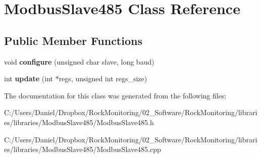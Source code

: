 \hypertarget{class_modbus_slave485}{}\section{Modbus\+Slave485 Class Reference}
\label{class_modbus_slave485}
\subsection*{Public Member Functions}
\begin{DoxyCompactItemize}
\item 
void {\bfseries configure} (unsigned char slave, long baud)\hypertarget{class_modbus_slave485_a46f357d45153690baae49e29453006b4}{}\label{class_modbus_slave485_a46f357d45153690baae49e29453006b4}

\item 
int {\bfseries update} (int $\ast$regs, unsigned int regs\+\_\+size)\hypertarget{class_modbus_slave485_aed08cef26051a09c8ac11cedaf23e9e8}{}\label{class_modbus_slave485_aed08cef26051a09c8ac11cedaf23e9e8}

\end{DoxyCompactItemize}


The documentation for this class was generated from the following files\+:\begin{DoxyCompactItemize}
\item 
C\+:/\+Users/\+Daniel/\+Dropbox/\+Rock\+Monitoring/02\+\_\+\+Software/\+Rock\+Monitoring/libraries/libraries/\+Modbus\+Slave485/Modbus\+Slave485.\+h\item 
C\+:/\+Users/\+Daniel/\+Dropbox/\+Rock\+Monitoring/02\+\_\+\+Software/\+Rock\+Monitoring/libraries/libraries/\+Modbus\+Slave485/Modbus\+Slave485.\+cpp\end{DoxyCompactItemize}
